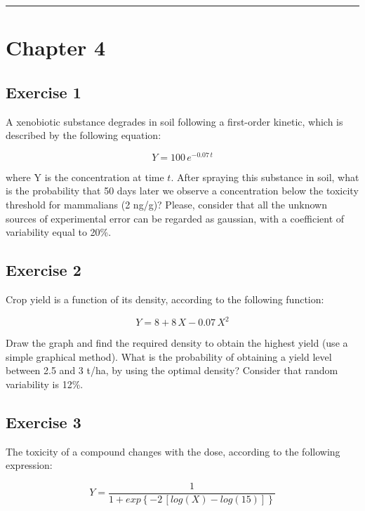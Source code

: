 \documentclass[a4paper,12pt,oneside]{book}
\begin{document}
\begin{center}\rule{0.5\linewidth}{0.5pt}\end{center}

\hypertarget{chapter-4}{%
\section{Chapter 4}\label{chapter-4}}

\hypertarget{exercise-1-1}{%
\subsection{Exercise 1}\label{exercise-1-1}}

A xenobiotic substance degrades in soil following a first-order kinetic, which is described by the following equation:

\[Y = 100 \, e^{-0.07 \, t}\]

where Y is the concentration at time \(t\). After spraying this substance in soil, what is the probability that 50 days later we observe a concentration below the toxicity threshold for mammalians (2 ng/g)? Please, consider that all the unknown sources of experimental error can be regarded as gaussian, with a coefficient of variability equal to 20\%.

\hypertarget{exercise-2-1}{%
\subsection{Exercise 2}\label{exercise-2-1}}

Crop yield is a function of its density, according to the following function:

\[ Y = 8 + 8 \, X - 0.07 \, X^2\]

Draw the graph and find the required density to obtain the highest yield (use a simple graphical method). What is the probability of obtaining a yield level between 2.5 and 3 t/ha, by using the optimal density? Consider that random variability is 12\%.

\hypertarget{exercise-3-1}{%
\subsection{Exercise 3}\label{exercise-3-1}}

The toxicity of a compound changes with the dose, according to the following expression:

\[ Y = \frac{1}{1 + exp\left\{ -2 \, \left[log(X) - log(15)\right] \right\}}\]
\end{document}
